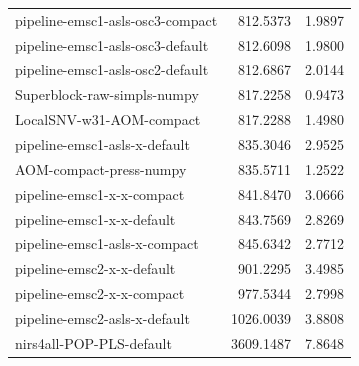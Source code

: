 \begin{tabular}{lrr}
pipeline-emsc1-asls-osc3-compact & 812.5373 & 1.9897 \\
pipeline-emsc1-asls-osc3-default & 812.6098 & 1.9800 \\
pipeline-emsc1-asls-osc2-default & 812.6867 & 2.0144 \\
Superblock-raw-simpls-numpy & 817.2258 & 0.9473 \\
LocalSNV-w31-AOM-compact & 817.2288 & 1.4980 \\
pipeline-emsc1-asls-x-default & 835.3046 & 2.9525 \\
AOM-compact-press-numpy & 835.5711 & 1.2522 \\
pipeline-emsc1-x-x-compact & 841.8470 & 3.0666 \\
pipeline-emsc1-x-x-default & 843.7569 & 2.8269 \\
pipeline-emsc1-asls-x-compact & 845.6342 & 2.7712 \\
pipeline-emsc2-x-x-default & 901.2295 & 3.4985 \\
pipeline-emsc2-x-x-compact & 977.5344 & 2.7998 \\
pipeline-emsc2-asls-x-default & 1026.0039 & 3.8808 \\
nirs4all-POP-PLS-default & 3609.1487 & 7.8648 \\
\bottomrule
\end{tabular}
